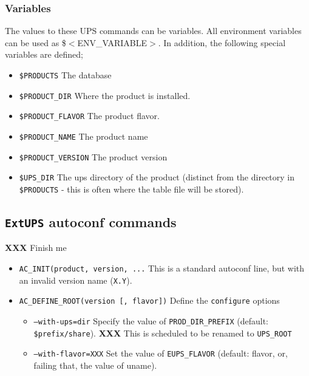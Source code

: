 \documentclass{article}
\newcommand{\XXX}[1]{\textbf{XXX} #1}
\newcommand{\code}[1]{\texttt{#1}}
\newcommand{\eups}{\code{ExtUPS}}
\begin{document}
\subsubsection{Variables}

The values to these UPS commands can be variables. All environment
variables can be used as \${$<$ENV\_VARIABLE$>$}. In addition, the following special
variables are defined;

\begin{itemize}
  \item \texttt{\${PRODUCTS}}
    The database
    
  \item \texttt{\${PRODUCT\_DIR}}
    Where the product is installed.
    
  \item \texttt{\${PRODUCT\_FLAVOR}}
    The product flavor.
    
  \item \texttt{\${PRODUCT\_NAME}}
    The product name
    
  \item \texttt{\${PRODUCT\_VERSION}}
    The product version
    
  \item \texttt{\${UPS\_DIR}}
    The ups directory of the product (distinct from the directory
    in \texttt{\$PRODUCTS} - this is often where the table file will be stored).
\end{itemize}

\subsection{\eups{} autoconf commands}
\label{autoconfReference}

\XXX{Finish me}

\begin{itemize}
  \item{\texttt{AC\_INIT(product, version, ...}}
    This is a standard autoconf line, but with an invalid version name (\texttt{X.Y}).

  \item{\texttt{AC\_DEFINE\_ROOT(version [, flavor])}}
    Define the \texttt{configure} options
    \begin{itemize}
      \item{\texttt{--with-ups=dir}}
        Specify the value of \texttt{PROD\_DIR\_PREFIX}
        (default: \texttt{\$prefix/share}).
        \XXX{This is scheduled to be renamed to \texttt{UPS\_ROOT}}
      \item{\texttt{--with-flavor=XXX}}
        Set the value of \texttt{EUPS\_FLAVOR}
        (default: flavor, or, failing that, the value of uname).
    \end{itemize}
\end{itemize}
\end{document}
